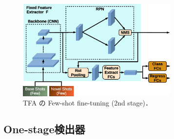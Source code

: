 \documentclass[originalpaper,fleqn]{jsaiart}     %
\begin{document}
\begin{figure}[tb]
    \begin{center}
        \includegraphics[width=8cm,clip]{fig/archi_TFA.eps}
    \end{center}
    \caption{ TFA の Few-shot fine-tuning (2nd stage)．}
    \label{fig:archi_TFA}
\end{figure}

\subsection{One-stage検出器}
\end{document}
